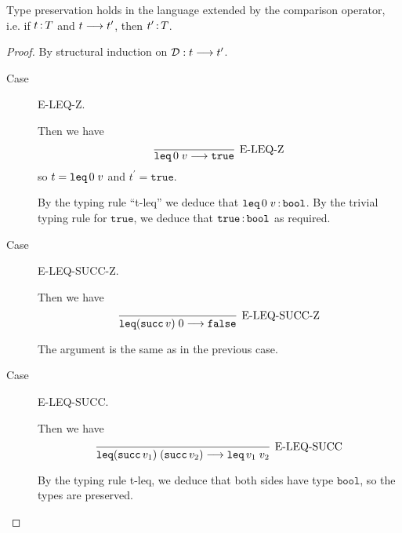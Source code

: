 \documentclass[11pt,letterpaper]{article}
\begin{document}
\begin{prop}
    Type preservation holds in the language extended by the comparison
    operator,
    i.e.
    if $t \operatorname{:} T$ and $t \longrightarrow t^\prime$, then $t^\prime \operatorname{:} T$.
\end{prop}

\begin{proof}
    By structural induction on $\mathcal{D} : t \longrightarrow t^\prime$.

    \begin{description}
        \item[Case] E-LEQ-Z.

            Then we have
            \begin{equation*}
                \infer[\text{E-LEQ-Z}]{
                    \Leq{0}{v}
                    \evalto
                    \mathtt{true}
                }{}
            \end{equation*}
            so $t = \operatorname{\mathtt{leq}} 0 \; v$ and $t^\prime = \mathtt{true}$.

            By the typing rule ``t-leq'' we deduce that
            $\operatorname{\mathtt{leq}} 0 \; v \operatorname{:} \mathtt{bool}$.
            By the trivial typing rule for $\mathtt{true}$, we deduce that
            $\mathtt{true} \operatorname{:} \mathtt{bool}$ as required.

        \item[Case] E-LEQ-SUCC-Z.

            Then we have
            \begin{equation*}
                \infer[\text{E-LEQ-SUCC-Z}]{
                    \Leq{(\Succ v)}{0}
                    \evalto
                    \mathtt{false}
                }{}
            \end{equation*}

            The argument is the same as in the previous case.

        \item[Case] E-LEQ-SUCC.

            Then we have
            \begin{equation*}
                \infer[\text{E-LEQ-SUCC}]{
                    \Leq{(\Succ v_1)}{(\Succ v_2)}
                    \evalto
                    \Leq{v_1}{v_2}
                }{}
            \end{equation*}

            By the typing rule t-leq, we deduce that both sides have type
            $\mathtt{bool}$, so the types are preserved.


\end{description}
\end{proof}
\end{document}
